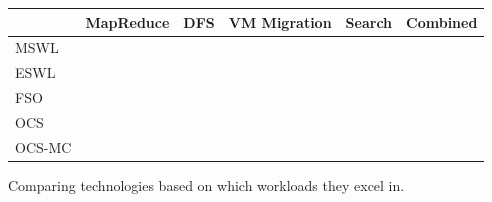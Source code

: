 


\begin{figure*}[t]
  \centering
  \begin{tabular}{| l | c | c | c | c | c |}
    \toprule
    & MapReduce & DFS & VM Migration & Search & Combined\\
    \midrule
    MSWL & & & & &\\
    ESWL & & & & &\\
    FSO & & & & &\\
    OCS & & & & &\\
    OCS-MC & & & & &\\
    \bottomrule
  \end{tabular}
  \caption{Comparing technologies based on which workloads they excel in.}
  \label{tab:workloads-to-technologies}
\end{figure*}

